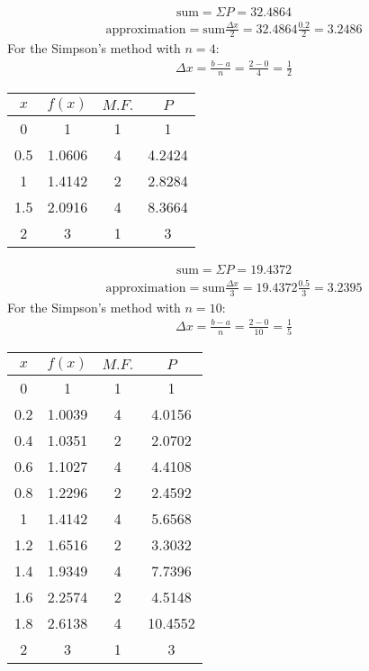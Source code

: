 \documentclass{article}
\begin{document}
\begin{align*}
	\text{sum} = \Sigma{P} = 32.4864
\end{align*}
\begin{align*}
	\text{approximation} = \text{sum} \frac{\Delta x}{2} = 32.4864 \frac{0.2}{2} = 3.2486
\end{align*}
For the Simpson's method with $n = 4$:
\begin{align*}
	\Delta x= \frac{b - a}{n} = \frac{2 - 0}{4} = \frac{1}{2}
\end{align*}
\begin{center}
	\begin{tabular}{|c|c|c|c|}
	\hline
	$x$ & 	$f(x)$ 		& $M.F.$ 	& $P$ 	\\ \hline
	0   		& 1    		& 1      	& 1 		\\ \hline
	0.5   		& 1.0606   	& 4     	& 4.2424 	\\ \hline
	1   		& 1.4142    	& 2      	& 2.8284 	\\ \hline
	1.5   		& 2.0916    	& 4      	& 8.3664 	\\ \hline
	2  		& 3    		& 1      	& 3 		\\ \hline
	\end{tabular}
\end{center}
\begin{align*}
	\text{sum} = \Sigma{P} = 19.4372
\end{align*}
\begin{align*}
	\text{approximation} = \text{sum} \frac{\Delta x}{3} = 19.4372 \frac{0.5}{3} = 3.2395
\end{align*}
For the Simpson's method with $n = 10$:
\begin{align*}
	\Delta x= \frac{b - a}{n} = \frac{2 - 0}{10} = \frac{1}{5}
\end{align*}
\begin{center}
	\begin{tabular}{|c|c|c|c|}
	\hline
	$x$ & 	$f(x)$ 		& $M.F.$ 	& $P$ 	\\ \hline
	0   		& 1    		& 1      	& 1 		\\ \hline
	0.2   		& 1.0039	   	& 4      	& 4.0156	\\ \hline
	0.4   		& 1.0351	    	& 2      	& 2.0702	\\ \hline
	0.6   		& 1.1027	    	& 4      	& 4.4108	\\ \hline
	0.8  		& 1.2296  		& 2      	& 2.4592	\\ \hline
	1   		& 1.4142  		& 4      	& 5.6568	\\ \hline
	1.2   		& 1.6516	   	& 2      	& 3.3032	\\ \hline
	1.4   		& 1.9349	    	& 4      	& 7.7396	\\ \hline
	1.6   		& 2.2574	    	& 2      	& 4.5148	\\ \hline
	1.8  		& 2.6138  		& 4      	& 10.4552 \\ \hline
	2		& 3			& 1		& 3		\\ \hline
	\end{tabular}
\end{center}
\end{document}
